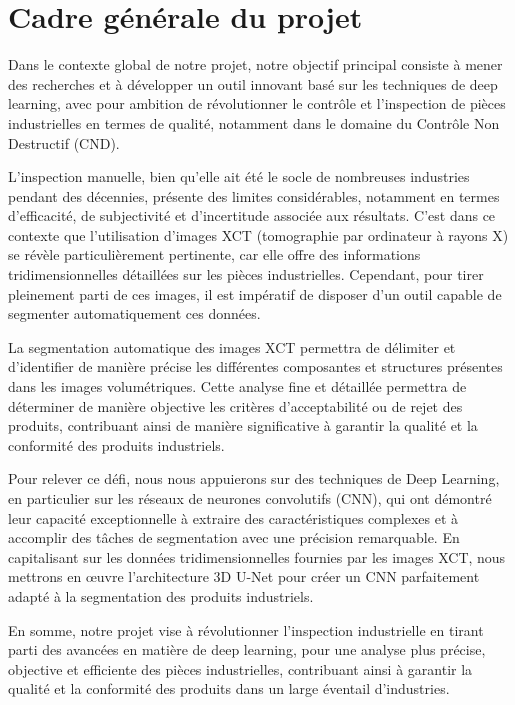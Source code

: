\documentclass{report}
\newenvironment{mystyle}{
	\setlength{\parindent}{0pt} %
	\setlength{\parskip}{10pt} %
	\fontsize{12pt}{14pt}\selectfont %
}{
}
\begin{document}
		\section{Cadre générale du projet}
		\begin{mystyle}
			Dans le contexte global de notre projet, notre objectif principal consiste à mener des recherches et à développer un outil innovant basé sur les techniques de deep learning, avec pour ambition de révolutionner le contrôle et l'inspection de pièces industrielles en termes de qualité, notamment dans le domaine du Contrôle Non Destructif (CND).
			
			L'inspection manuelle, bien qu'elle ait été le socle de nombreuses industries pendant des décennies, présente des limites considérables, notamment en termes d'efficacité, de subjectivité et d'incertitude associée aux résultats. C'est dans ce contexte que l'utilisation d'images XCT (tomographie par ordinateur à rayons X) se révèle particulièrement pertinente, car elle offre des informations tridimensionnelles détaillées sur les pièces industrielles. Cependant, pour tirer pleinement parti de ces images, il est impératif de disposer d'un outil capable de segmenter automatiquement ces données.
			
			La segmentation automatique des images XCT permettra de délimiter et d'identifier de manière précise les différentes composantes et structures présentes dans les images volumétriques. Cette analyse fine et détaillée permettra de déterminer de manière objective les critères d'acceptabilité ou de rejet des produits, contribuant ainsi de manière significative à garantir la qualité et la conformité des produits industriels.
			
			Pour relever ce défi, nous nous appuierons sur des techniques de Deep Learning, en particulier sur les réseaux de neurones convolutifs (CNN), qui ont démontré leur capacité exceptionnelle à extraire des caractéristiques complexes et à accomplir des tâches de segmentation avec une précision remarquable. En capitalisant sur les données tridimensionnelles fournies par les images XCT, nous mettrons en œuvre l'architecture 3D U-Net pour créer un CNN parfaitement adapté à la segmentation des produits industriels.
			
			En somme, notre projet vise à révolutionner l'inspection industrielle en tirant parti des avancées en matière de deep learning, pour une analyse plus précise, objective et efficiente des pièces industrielles, contribuant ainsi à garantir la qualité et la conformité des produits dans un large éventail d'industries.
		\end{mystyle}
		
\end{document}
